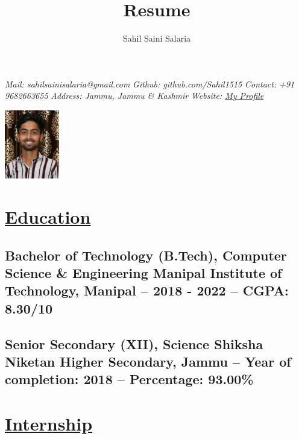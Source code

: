 \documentclass{article}
\makeatletter
\renewcommand{\maketitle}{
    \begin{flushleft}        
        {\huge\rmfamily
        \theauthor}\newline
        \vspace{0.1em}
        \textit{Mail: sahilsainisalaria@gmail.com }  \newline  
        \textit{ Github: github.com/Sahil1515 }  \newline 
        \textit{ Contact: +91 9682663655 }  \newline 
        \textit{ Address: Jammu, Jammu \& Kashmir }  \newline 
        \textit{ Website:  \href{https://sahil1515.github.io/My-Website/}{My Profile}
        }  \newline 
        
       

    \end{flushleft}
}
\makeatother
\begin{document}
\begin{multicols}{2}
        \title{Resume}
            \author{Sahil Saini Salaria}
        \maketitle
          
        \begin{flushright}
            \includegraphics[height=3cm]{Sahil.jpeg}
        \end{flushright}
        
\end{multicols}


\section{\underline{Education}}

    \subsection{\textbf{Bachelor of Technology (B.Tech), Computer Science \& Engineering}\newline 
    \textmd{Manipal Institute of Technology, Manipal --  2018 - 2022 -- CGPA: 8.30/10}}
    
    \subsection{\textbf{Senior Secondary (XII), Science}\newline 
    \textmd{ Shiksha Niketan Higher Secondary, Jammu -- Year of completion: 2018 --  Percentage: 93.00\%}}
    
   
\section{\underline{Internship}}
\end{document}
